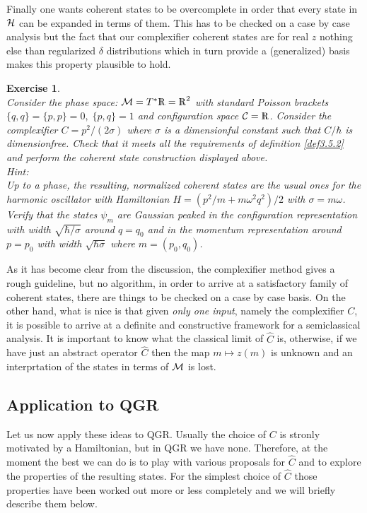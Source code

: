 \documentclass[12pt]{report}
\newtheorem{Exercise}{Exercise}[section]
\def\Rl{{\mathchoice
{\setbox0=\hbox{$\displaystyle\rm R$}\hbox{\hbox to0pt
{\kern0.4\wd0\vrule height0.9\ht0\hss}\box0}}
{\setbox0=\hbox{$\textstyle\rm R$}\hbox{\hbox to0pt
{\kern0.4\wd0\vrule height0.9\ht0\hss}\box0}}
{\setbox0=\hbox{$\scriptstyle\rm R$}\hbox{\hbox to0pt
{\kern0.4\wd0\vrule height0.9\ht0\hss}\box0}}
{\setbox0=\hbox{$\scriptscriptstyle\rm R$}\hbox{\hbox to0pt
{\kern0.4\wd0\vrule height0.9\ht0\hss}\box0}}}}
\begin{document}
Finally one wants coherent states to be overcomplete in order that every
state in $\cal H$ can be expanded in terms of them. This has to be checked
on a case by case analysis but the fact that our complexifier coherent 
states are for real $z$ nothing else than regularized $\delta$ 
distributions which in turn provide a (generalized) basis makes this 
property plausible to hold.
%
\begin{Exercise} \label{ex3.5.1} ~~~~\\
Consider the phase space: ${\cal M}=T^\ast \Rl=\Rl^2$ with standard 
Poisson brackets $\{q,q\}=\{p,p\}=0,\;\{p,q\}=1$ and
configuration space ${\cal C}=\Rl$. Consider the 
complexifier $C=p^2/(2\sigma)$ where $\sigma$ is a dimensionful
constant such that $C/\hbar$ is dimensionfree. Check 
that it meets all the requirements 
of definition \ref{def3.5.2} and perform the coherent state construction
displayed above. \\
Hint:\\
Up to a phase, the resulting, normalized coherent states are the usual 
ones for the 
harmonic oscillator with Hamiltonian $H=(p^2/m+m\omega^2 q^2)/2$ with
$\sigma=m\omega$. Verify that the states $\psi_m$ are Gaussian peaked in 
the configuration representation with width $\sqrt{\hbar/\sigma}$ 
around $q=q_0$ and in the momentum representation around $p=p_0$ with width 
$\sqrt{\hbar\sigma}$ where $m=(p_0,q_0)$.  
\end{Exercise}
%
As it has become clear from the discussion, the complexifier method 
gives a rough guideline, but no algorithm, in order to arrive at a 
satisfactory family of coherent states, there are things to be checked
on a case by case basis. On the other hand, what is nice is that given 
{\it only one input}, namely the complexifier $C$, it is possible to arrive 
at a definite and constructive framework for a semiclassical analysis.
It is important to know what the classical limit of $\hat{C}$ is, 
otherwise, if we have just an abstract operator $\hat{C}$ then 
the map $m\mapsto z(m)$ is unknown and an interprtation of the states
in terms of $\cal M$ is lost.

\subsection{Application to QGR}
\label{s3.5.2}

Let us now apply these ideas to QGR. Usually the choice of $C$ is stronly
motivated by a Hamiltonian, but in QGR we have none. Therefore, at the 
moment the best we can do is to play with various proposals for 
$\hat{C}$ and to explore the properties of the resulting states.
For the simplest choice of $\hat{C}$ \cite{64} those properties have 
been worked out more or less completely and we will briefly describe 
them below. 
\end{document}
